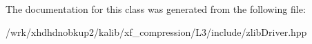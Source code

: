 The documentation for this class was generated from the following file\-:\begin{DoxyCompactItemize}
\item 
/wrk/xhdhdnobkup2/kalib/xf\-\_\-compression/\-L3/include/zlib\-Driver.\-hpp\end{DoxyCompactItemize}
